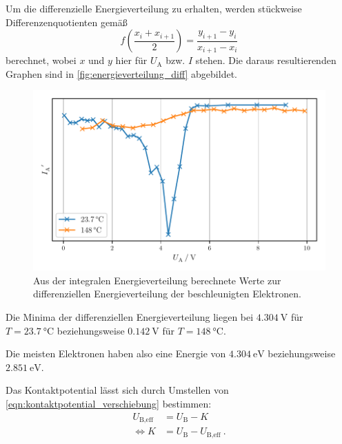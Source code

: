 Um die differenzielle Energieverteilung zu erhalten,
werden stückweise Differenzenquotienten gemäß
\[ f\left( \frac{x_i + x_{i+1}}{2} \right) = \frac{y_{i+1} - y_i}{x_{i+1} - x_i} \]
berechnet,
wobei $x$ und $y$ hier für $U_\text{A}$ bzw. $I$ stehen.
Die daraus resultierenden Graphen sind in \autoref{fig:energieverteilung_diff} abgebildet.
%

\begin{figure}[H]
    \centering
    \includegraphics[width=\textwidth]{build/plt/energieverteilung_diff.pdf}
    \caption{Aus der integralen Energieverteilung berechnete Werte zur differenziellen Energieverteilung der beschleunigten Elektronen.}
    \label{fig:energieverteilung_diff}
\end{figure}

Die Minima der differenziellen Energieverteilung liegen bei
$\SI{4.304}{\volt}$ für $T = \SI{23.7}{\celsius}$
beziehungsweise $\SI{0.142}{\volt}$ für $T = \SI{148}{\celsius}$.

Die meisten Elektronen haben also eine Energie von
$\SI{4.304}{\electronvolt}$ beziehungsweise $\SI{2.851}{\electronvolt}$.


Das Kontaktpotential lässt sich durch Umstellen von \autoref{eqn:kontaktpotential_verschiebung} bestimmen:
\begin{align*}
  U_\text{B,eff} &= U_\text{B} - K \\
  \Leftrightarrow
  K &= U_\text{B} - U_\text{B,eff} \ .
\end{align*}

